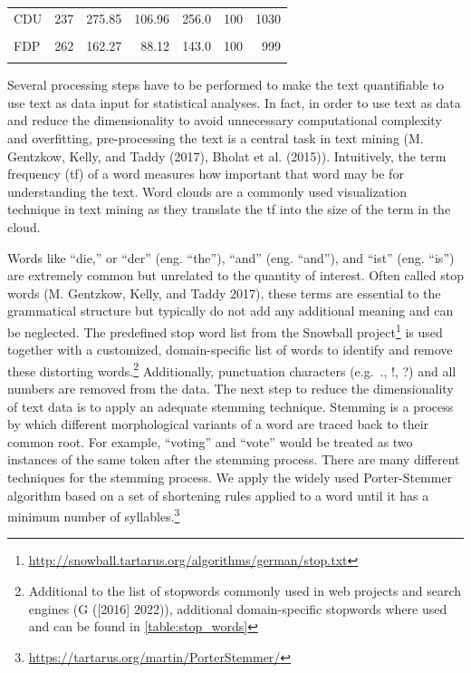 \documentclass[
  12pt,
]{article}
\begin{document}
\begin{table}[H]
\begin{tabular}[t]{lrrrrrr}
\hspace{1em}CDU & 237 & 275.85 & 106.96 & 256.0 & 100 & 1030\\
\hspace{1em}\cellcolor{gray!6}{DIE LINKE} & \cellcolor{gray!6}{631} & \cellcolor{gray!6}{200.36} & \cellcolor{gray!6}{70.66} & \cellcolor{gray!6}{190.0} & \cellcolor{gray!6}{101} & \cellcolor{gray!6}{1048}\\
\hspace{1em}FDP & 262 & 162.27 & 88.12 & 143.0 & 100 & 999\\
\hspace{1em}\cellcolor{gray!6}{SPD} & \cellcolor{gray!6}{301} & \cellcolor{gray!6}{213.17} & \cellcolor{gray!6}{56.57} & \cellcolor{gray!6}{208.0} & \cellcolor{gray!6}{103} & \cellcolor{gray!6}{429}\\
\bottomrule
\end{tabular}
\end{table}

Several processing steps have to be performed to make the text
quantifiable to use text as data input for statistical analyses. In
fact, in order to use text as data and reduce the dimensionality to
avoid unnecessary computational complexity and overfitting,
pre-processing the text is a central task in text mining (M. Gentzkow,
Kelly, and Taddy (2017), Bholat et al. (2015)). Intuitively, the term
frequency (tf) of a word measures how important that word may be for
understanding the text. Word clouds are a commonly used visualization
technique in text mining as they translate the tf into the size of the
term in the cloud.

Words like ``die,'' or ``der'' (eng. ``the''), ``and'' (eng. ``and''),
and ``ist'' (eng. ``is'') are extremely common but unrelated to the
quantity of interest. Often called stop words (M. Gentzkow, Kelly, and
Taddy 2017), these terms are essential to the grammatical structure but
typically do not add any additional meaning and can be neglected. The
predefined stop word list from the Snowball project\footnote{\url{http://snowball.tartarus.org/algorithms/german/stop.txt}}
is used together with a customized, domain-specific list of words to
identify and remove these distorting words.\footnote{Additional to the
  list of stopwords commonly used in web projects and search engines (G
  ({[}2016{]} 2022)), additional domain-specific stopwords where used
  and can be found in \autoref{table:stop_words}} Additionally,
punctuation characters (e.g.~., !, ?) and all numbers are removed from
the data. The next step to reduce the dimensionality of text data is to
apply an adequate stemming technique. Stemming is a process by which
different morphological variants of a word are traced back to their
common root. For example, ``voting'' and ``vote'' would be treated as
two instances of the same token after the stemming process. There are
many different techniques for the stemming process. We apply the widely
used Porter-Stemmer algorithm based on a set of shortening rules applied
to a word until it has a minimum number of syllables.\footnote{\url{https://tartarus.org/martin/PorterStemmer/}}
\end{document}
